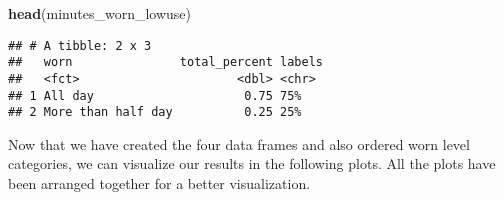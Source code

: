 \documentclass[
]{article}
\newenvironment{Shaded}{\begin{snugshade}}{\end{snugshade}}
\newcommand{\FunctionTok}[1]{\textcolor[rgb]{0.13,0.29,0.53}{\textbf{#1}}}
\newcommand{\NormalTok}[1]{#1}
\begin{document}
\begin{Shaded}
\begin{Highlighting}[]
\FunctionTok{head}\NormalTok{(minutes\_worn\_lowuse)}
\end{Highlighting}
\end{Shaded}

\begin{verbatim}
## # A tibble: 2 x 3
##   worn               total_percent labels
##   <fct>                      <dbl> <chr> 
## 1 All day                     0.75 75%   
## 2 More than half day          0.25 25%
\end{verbatim}

Now that we have created the four data frames and also ordered worn
level categories, we can visualize our results in the following plots.
All the plots have been arranged together for a better visualization.
\end{document}
